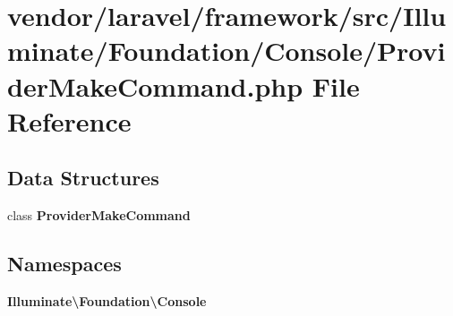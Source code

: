 \section{vendor/laravel/framework/src/\+Illuminate/\+Foundation/\+Console/\+Provider\+Make\+Command.php File Reference}
\label{_provider_make_command_8php}
\subsection*{Data Structures}
\begin{DoxyCompactItemize}
\item 
class {\bf Provider\+Make\+Command}
\end{DoxyCompactItemize}
\subsection*{Namespaces}
\begin{DoxyCompactItemize}
\item 
 {\bf Illuminate\textbackslash{}\+Foundation\textbackslash{}\+Console}
\end{DoxyCompactItemize}
